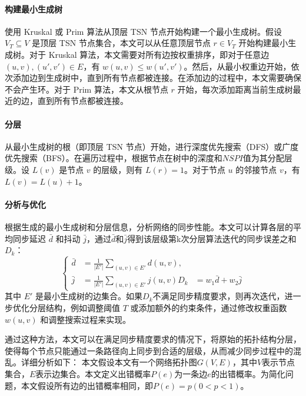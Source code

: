 \documentclass[UTF8,a4paper,12pt]{ctexart}
\numberwithin{equation}{section}
\begin{document}
	\paragraph{构建最小生成树}使用 Kruskal 或 Prim 算法从顶层 TSN 节点开始构建一个最小生成树。假设 $V_T \subseteq V$ 是顶层 TSN 节点集合，本文可以从任意顶层节点 $r \in V_T$ 开始构建最小生成树。对于 Kruskal 算法，本文需要对所有边按权重排序，即对于任意边 $(u, v), (u', v') \in E$，有 $w(u, v) \le w(u', v')$。然后，从最小权重边开始，依次添加边到生成树中，直到所有节点都被连接。在添加边的过程中，本文需要确保不会产生环。对于 Prim 算法，本文从根节点 $r$ 开始，每次添加距离当前生成树最近的边，直到所有节点都被连接。
	
	\paragraph{分层}从最小生成树的根（即顶层 TSN 节点）开始，进行深度优先搜索（DFS）或广度优先搜索（BFS）。在遍历过程中，根据节点在树中的深度和$NSPI$值为其分配层级。设 $L(v)$ 是节点 $v$ 的层级，则有 $L(r) = 1$。对于节点 $u$ 的邻接节点 $v$，有 $L(v) = L(u) + 1$。
	
	\paragraph{分析与优化}根据生成的最小生成树和分层信息，分析网络的同步性能。本文可以计算各层的平均同步延迟 $\bar{d}$ 和抖动 $\bar{j}$，通过$\bar{d}$和$\bar{j}$得到该层级第k次分层算法迭代的同步误差之和$D_k$：
	\begin{equation}
		\left\{
		\begin{aligned}
			\bar{d} &= \frac{1}{\lvert E' \rvert} \sum_{(u,v) \in E'} d(u,v),\\
			\bar{j} &= \frac{1}{\lvert E' \rvert} \sum_{(u,v) \in E'} j(u,v)
			D_k &= w_1 \bar{d} + w_2 \bar{j}
		\end{aligned}
		\right.
	\end{equation}
	其中 $E'$ 是最小生成树的边集合。如果$D_k$不满足同步精度要求，则再次迭代，进一步优化分层结构，例如调整阈值 $T$ 或添加额外的约束条件，通过修改权重函数 $w(u, v)$ 和调整搜索过程来实现。
	
	通过这种方法，本文可以在满足同步精度要求的情况下，将原始的拓扑结构分层，使得每个节点只能通过一条路径向上同步到合适的层级，从而减少同步过程中的混乱。详细分析如下：
	本文假设本文有一个网络拓扑图$G(V, E)$，其中$V$表示节点集合，$E$表示边集合。本文定义出错概率$P(e)$为一条边$e$的出错概率。为简化问题，本文假设所有边的出错概率相同，即$P(e) = p (0 < p < 1)$。
	
\end{document}

